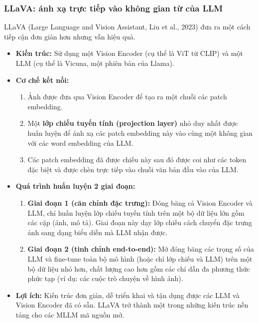\subsubsection{LLaVA: ánh xạ trực tiếp vào không gian từ của LLM}
LLaVA (Large Language and Vision Assistant, Liu et al., 2023) đưa ra một cách tiếp cận đơn giản hơn nhưng vẫn hiệu quả.
\begin{itemize}
    \item \textbf{Kiến trúc:} Sử dụng một Vision Encoder (cụ thể là ViT từ CLIP) và một LLM (cụ thể là Vicuna, một phiên bản của Llama).
    \item \textbf{Cơ chế kết nối:}
        \begin{enumerate}
            \item Ảnh được đưa qua Vision Encoder để tạo ra một chuỗi các patch embedding.
            \item Một \textbf{lớp chiếu tuyến tính (projection layer)} nhỏ duy nhất được huấn luyện để ánh xạ các patch embedding này vào cùng một không gian với các word embedding của LLM.
            \item Các patch embedding đã được chiếu này sau đó được coi như các token đặc biệt và được chèn trực tiếp vào chuỗi văn bản đầu vào của LLM.
        \end{enumerate}
    \item \textbf{Quá trình huấn luyện 2 giai đoạn:}
        \begin{enumerate}
            \item \textbf{Giai đoạn 1 (căn chỉnh đặc trưng):} Đóng băng cả Vision Encoder và LLM, chỉ huấn luyện lớp chiếu tuyến tính trên một bộ dữ liệu lớn gồm các cặp (ảnh, mô tả). Giai đoạn này dạy lớp chiếu cách chuyển đặc trưng ảnh sang dạng biểu diễn mà LLM nhận được.
            \item \textbf{Giai đoạn 2 (tinh chỉnh end-to-end):} Mở đóng băng các trọng số của LLM và fine-tune toàn bộ mô hình (hoặc chỉ lớp chiếu và LLM) trên một bộ dữ liệu nhỏ hơn, chất lượng cao hơn gồm các chỉ dẫn đa phương thức phức tạp (ví dụ: các cuộc trò chuyện về hình ảnh).
        \end{enumerate}
    \item \textbf{Lợi ích:} Kiến trúc đơn giản, dễ triển khai và tận dụng được các LLM và Vision Encoder đã có sẵn. LLaVA trở thành một trong những kiến trúc nền tảng cho các MLLM mã nguồn mở.
\end{itemize}

